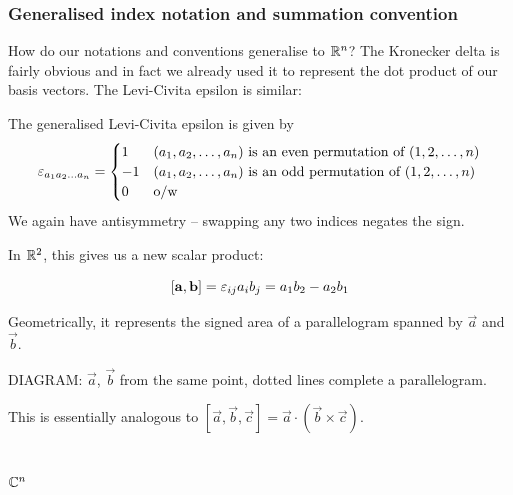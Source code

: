 \documentclass{../template/note}
\begin{document}
    \subsubsection{Generalised index notation and summation convention}

    How do our notations and conventions generalise to \(\mathbb R^n\)? The Kronecker delta is fairly obvious and in fact we already used it to represent the dot product of our basis vectors. The Levi-Civita epsilon is similar:

    \begin{definition}
        The generalised Levi-Civita epsilon is given by
        \begin{align*}
            \varepsilon_{a_1a_2\dots a_n} =
            \begin{cases}
                1 & (a_1, a_2, \dots, a_n) \text{ is an even permutation of } (1, 2, \dots, n) \\
                -1 & (a_1, a_2, \dots, a_n) \text{ is an odd permutation of } (1, 2, \dots, n) \\
                0 & \text{o/w}
            \end{cases}
        \end{align*}
        We again have antisymmetry -- swapping any two indices negates the sign.
    \end{definition}

    In \(\mathbb R^2\), this gives us a new scalar product:

    \[
        [\vec a, \vec b] = \lv{ij}a_ib_j = a_1b_2 - a_2b_1
    \]

    Geometrically, it represents the signed area of a parallelogram spanned by \(\vec a\) and \(\vec b\).

    DIAGRAM: \(\vec a\), \(\vec b\) from the same point, dotted lines complete a parallelogram.

    This is essentially analogous to \([\vec a, \vec b, \vec c] = \vec a \cdot (\vec b \times \vec c)\).

    \subsection{\(\mathbb C^n\)}
\end{document}
